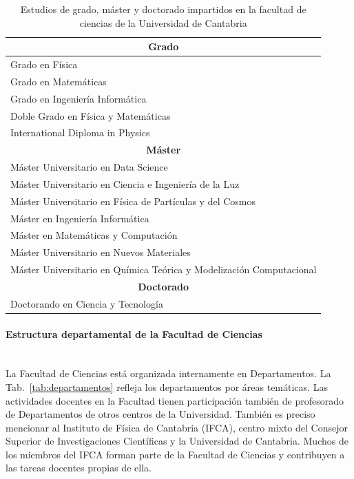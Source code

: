 \begin{table}[!ht]
\centering
\begin{tabular}{|l|}
\hline\hline
\multicolumn{1}{|c|}{\textbf{Grado}}\\
\hline\hline
Grado en Física \\
Grado en Matemáticas \\
Grado en Ingeniería Informática \\
Doble Grado en Física y Matemáticas \\
International Diploma in Physics \\
\hline\hline
\multicolumn{1}{|c|}{\textbf{Máster}}\\
\hline\hline
Máster Universitario en Data Science \\
Máster Universitario en Ciencia e Ingeniería de la Luz \\
Máster Universitario en Física de Partículas y del Cosmos \\
Máster en Ingeniería Informática \\
Máster en Matemáticas y Computación \\
Máster Universitario en Nuevos Materiales \\
Máster Universitario en Química Teórica y Modelización Computacional \\
\hline\hline
\multicolumn{1}{|c|}{\textbf{Doctorado}}\\
\hline\hline
Doctorando en Ciencia y Tecnología \\
\hline\hline
\end{tabular}
\caption{\label{tab:estudios} Estudios de grado, máster y doctorado impartidos en la facultad de ciencias de la Universidad de Cantabria}
\end{table}

\paragraph{Estructura departamental de la Facultad de Ciencias\\\\}

La Facultad de Ciencias está organizada internamente en Departamentos. La Tab.~\ref{tab:departamentos} refleja los departamentos por áreas temáticas. Las actividades docentes en la Facultad tienen participación también de profesorado de Departamentos de otros centros de la Universidad. También es preciso mencionar al Instituto de Física de Cantabria (IFCA), centro mixto del Consejor Superior de Investigaciones Científicas y la Universidad de Cantabria. Muchos de los miembros del IFCA forman parte de la Facultad de Ciencias y contribuyen a las tareas docentes propias de ella.


